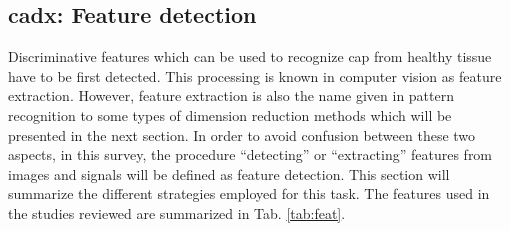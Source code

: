 \subsection{\ac{cadx}: Feature detection} \label{subsec:featuredetection}

Discriminative features which can be used to recognize \ac{cap} from healthy tissue have to be first detected. This processing is known in computer vision as feature extraction. However, feature extraction is also the name given in pattern recognition to some types of dimension reduction methods which will be presented in the next section. In order to avoid confusion between these two aspects, in this survey, the procedure ``detecting'' or ``extracting'' features from images and signals will be defined as feature detection. This section will summarize the different strategies employed for this task. The features used in the studies reviewed are summarized in Tab. \ref{tab:feat}.

